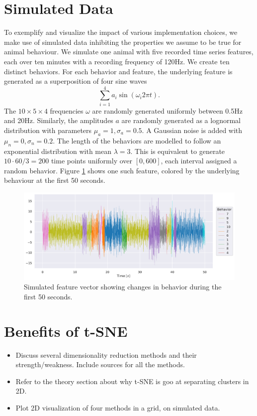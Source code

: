 \documentclass[a4paper]{memoir}
\theoremstyle{plain}
\theoremstyle{definition}
\theoremstyle{remark}
\begin{document}
\section{Simulated Data}
To exemplify and visualize the impact of various implementation choices, we make use of simulated data inhibiting the properties we assume to be true for animal behaviour.
We simulate one animal with five recorded time series features, each over ten minutes with a recording frequency of 120Hz.
We create ten distinct behaviors.
For each behavior and feature, the underlying feature is generated as a superposition of four sine waves
\begin{equation*}
        \sum_{i = 1}^{4} a_i \sin (\omega_i 2 \pi t).
\end{equation*}
The $10 \times 5 \times 4$ frequencies $\omega$ are randomly generated uniformly between 0.5Hz and 20Hz.
Similarly, the amplitudes $a$ are randomly generated as a lognormal distribution with parameters $\mu_a = 1, \sigma_a = 0.5$.
A Gaussian noise is added with $\mu_n = 0, \sigma_n = 0.2$.
The length of the behaviors are modelled to follow an exponential distribution with mean $\lambda = 3$.
This is equivalent to generate $10 \cdot 60 / 3 = 200$ time points uniformly over $[0, 600]$, each interval assigned a random behavior.
Figure \ref{fig:color_coded_feature_1} shows one such feature, colored by the underlying behaviour at the first 50 seconds.


\begin{figure}[tb]
        \centering
        \includegraphics[width=1\linewidth]{./code/figures/simulated/features/color_coded_feature_1.pdf}
        \caption{Simulated feature vector showing changes in behavior during the first 50 seconds.}
        \label{fig:color_coded_feature_1}
\end{figure}


\section{Benefits of t-SNE}

\begin{itemize}
        \item Discuss several dimensionality reduction methods and their strength/weakness. 
                Include sources for all the methods.
        \item Refer to the theory section about why t-SNE is goo at separating clusters in 2D.
        \item 
        Plot 2D visualization of four methods in a grid, on simulated data.
\end{itemize}




\newpage
\printbibliography
\end{document}
